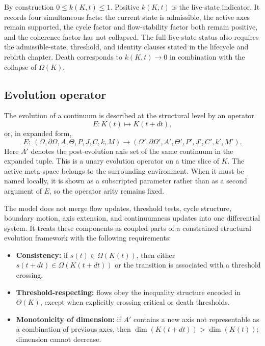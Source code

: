 By construction \(0 \le k(K,t) \le 1\).
Positive \(k(K,t)\) is the live-state indicator. It records four
simultaneous facts: the current state is admissible, the active axes remain
supported, the cycle factor and flow-stability factor both remain positive,
and the coherence factor has not collapsed. The full live-state status
also requires the admissible-state, threshold, and identity clauses stated in
the lifecycle and rebirth chapter.
Death corresponds to \(k(K,t)\to 0\) in combination with the collapse of \(\Omega(K)\).

\subsection{Evolution operator}

The evolution of a continuum is described at the structural level by an operator
\[
    E: K(t) \mapsto K(t+dt),
\]
or, in expanded form,
\[
    E:\ (\Omega,\partial\Omega,A,\Theta,P,J,C,k,M)
    \longrightarrow (\Omega',\partial\Omega',A',\Theta',P',J',C',k',M').
\]
Here \(A'\) denotes the post-evolution axis set of the same continuum in the
expanded tuple.
This is a unary evolution operator on a time slice of \(K\). The active
meta-space belongs to the surrounding environment. When it must be named
locally, it is shown as a subscripted parameter rather than as a second
argument of \(E\), so the operator arity remains fixed.

The model does not merge flow updates, threshold tests, cycle structure,
boundary motion, axis extension, and continuumness updates into one
differential system. It treats these components as coupled parts of a
constrained structural evolution framework with the following requirements:

\begin{itemize}
    \item \textbf{Consistency:} if \(s(t) \in \Omega(K(t))\), then either \(s(t+dt) \in \Omega(K(t+dt))\) or the transition is associated with a threshold crossing.
    \item \textbf{Threshold-respecting:} flows obey the inequality structure encoded in \(\Theta(K)\), except when explicitly crossing critical or death thresholds.
    \item \textbf{Monotonicity of dimension:} if \(A'\) contains a new axis not representable as a combination of previous axes, then \(\dim(K(t+dt)) > \dim(K(t))\); dimension cannot decrease.
\end{itemize}

